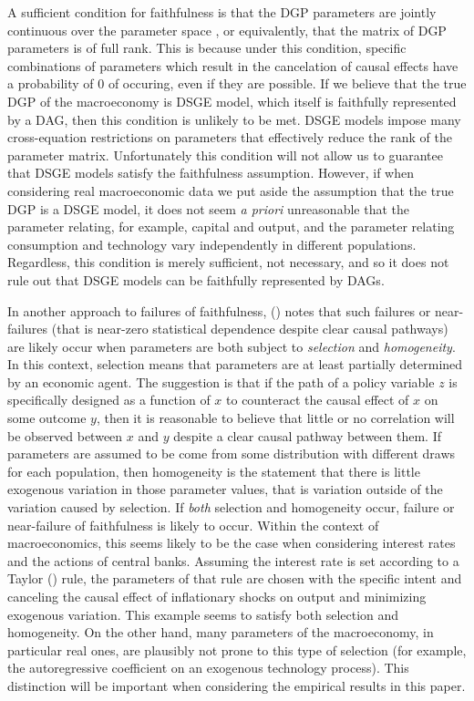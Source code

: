 \documentclass{article}
\begin{document}
A sufficient condition for faithfulness is that the DGP parameters are jointly continuous over the parameter space \parencite{steel2006homogeneity}, or equivalently, that the matrix of DGP parameters is of full rank. This is because under this condition, specific combinations of parameters which result in the cancelation of causal effects have a probability of 0 of occuring, even if they are possible. If we believe that the true DGP of the macroeconomy is DSGE model, which itself is faithfully represented by a DAG, then this condition is unlikely to be met. DSGE models impose many cross-equation restrictions on parameters that effectively reduce the rank of the parameter matrix. Unfortunately this condition will not allow us to guarantee that DSGE models satisfy the faithfulness assumption. However, if when considering real macroeconomic data we put aside the assumption that the true DGP is a DSGE model, it does not seem \textit{a priori} unreasonable that the parameter relating, for example, capital and output, and the parameter relating consumption and technology vary independently in different populations. Regardless, this condition is merely sufficient, not necessary, and so it does not rule out that DSGE models can be faithfully represented by DAGs. 

In another approach to failures of faithfulness, \citeauthor{steel2006homogeneity} (\citeyear{steel2006homogeneity}) notes that such failures or near-failures (that is near-zero statistical dependence despite clear causal pathways) are likely occur when parameters are both subject to \textit{selection} and \textit{homogeneity}. In this context, selection means that parameters are at least partially determined by an economic agent. The suggestion is that if the path of a policy variable $z$ is specifically designed as a function of $x$ to counteract the causal effect of $x$ on some outcome $y$, then it is reasonable to believe that little or no correlation will be observed between $x$ and $y$ despite a clear causal pathway between them. If parameters are assumed to be come from some distribution with different draws for each population, then homogeneity is the statement that there is little exogenous variation in those parameter values, that is variation outside of the variation caused by selection. If \textit{both} selection and homogeneity occur, failure or near-failure of faithfulness is likely to occur. Within the context of macroeconomics, this seems likely to be the case when considering interest rates and the actions of central banks. Assuming the interest rate is set according to a Taylor (\citeyear{taylor1993discretion}) rule, the parameters of that rule are chosen with the specific intent and canceling the causal effect of inflationary shocks on output and minimizing exogenous variation. This example seems to satisfy both selection and homogeneity. On the other hand, many parameters of the macroeconomy, in particular real ones, are plausibly not prone to this type of selection (for example, the autoregressive coefficient on an exogenous technology process). This distinction will be important when considering the empirical results in this paper.
\end{document}
